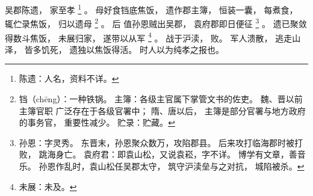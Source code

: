 
\switchcolumn*[\section{}]

吴郡陈遗，
家至孝%
\footnote{%
    陈遗：人名，资料不详。
}%
。
母好食铛底焦饭，
遗作郡主簿，
恒装一囊，
每煮食，
辄伫录焦饭，
归以遗母%
\footnote{%
    铛（chēng）：一种铁锅。
    主簿：各级主官属下掌管文书的佐吏。
          魏、晋以前主簿官职
          广泛存在于各级官署中；
          隋、唐以后，
          主簿是部分官署与地方政府的事务官，
          重要性减少。
    贮录：贮藏。
}%
。
后
值孙恩贼出吴郡，
袁府郡即日便征%
\footnote{%
    孙恩：字灵秀。
          东晋末，孙恩聚众数万，攻陷郡县。
          后来攻打临海郡时被打败，
          跳海身亡。
    袁府君：即袁山松，又说袁崧，字不详。
            博学有文章，善音乐。
            孙恩作乱时，袁山松任吴郡太守，
            筑守沪渎垒与之对抗，
            城陷被杀。
}%
。
遗已聚敛得数斗焦饭，
未展归家，
遂带以从军%
\footnote{%
    未展：未及。
}%
。
战于沪渎，
败。
军人溃散，
逃走山泽，
皆多饥死，
遗独以焦饭得活。
时人以为纯孝之报也。

\switchcolumn



